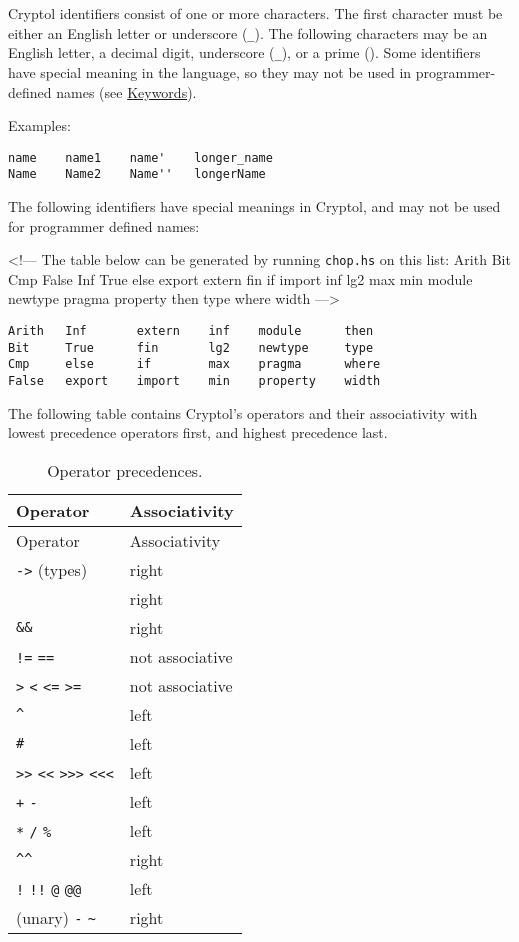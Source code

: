 Cryptol identifiers consist of one or more characters. The first
character must be either an English letter or underscore (\texttt{\_}).
The following characters may be an English letter, a decimal digit,
underscore (\texttt{\_}), or a prime (\texttt{\textquotesingle{}}). Some
identifiers have special meaning in the language, so they may not be
used in programmer-defined names (see
\hyperref[keywords-and-built-in-operators]{Keywords}).

Examples:

\begin{verbatim}
name    name1    name'    longer_name
Name    Name2    Name''   longerName
\end{verbatim}


The following identifiers have special meanings in Cryptol, and may not
be used for programmer defined names:

\textless{}!--- The table below can be generated by running
\texttt{chop.hs} on this list: Arith Bit Cmp False Inf True else export
extern fin if import inf lg2 max min module newtype pragma property then
type where width ---\textgreater{}

\begin{verbatim}
Arith   Inf       extern    inf    module      then     
Bit     True      fin       lg2    newtype     type     
Cmp     else      if        max    pragma      where    
False   export    import    min    property    width    
\end{verbatim}

The following table contains Cryptol's operators and their associativity
with lowest precedence operators first, and highest precedence last.

\begin{longtable}[c]{@{}ll@{}}
\caption{Operator precedences.}\tabularnewline
\toprule
Operator & Associativity\tabularnewline
\midrule
\endfirsthead
\toprule
Operator & Associativity\tabularnewline
\midrule
\endhead
\texttt{-\textgreater{}} (types) & right\tabularnewline
\texttt{\textbar{}\textbar{}} & right\tabularnewline
\texttt{\&\&} & right\tabularnewline
\texttt{!=} \texttt{==} & not associative\tabularnewline
\texttt{\textgreater{}} \texttt{\textless{}} \texttt{\textless{}=}
\texttt{\textgreater{}=} & not associative\tabularnewline
\texttt{\^{}} & left\tabularnewline
\texttt{\#} & left\tabularnewline
\texttt{\textgreater{}\textgreater{}} \texttt{\textless{}\textless{}}
\texttt{\textgreater{}\textgreater{}\textgreater{}}
\texttt{\textless{}\textless{}\textless{}} & left\tabularnewline
\texttt{+} \texttt{-} & left\tabularnewline
\texttt{*} \texttt{/} \texttt{\%} & left\tabularnewline
\texttt{\^{}\^{}} & right\tabularnewline
\texttt{!} \texttt{!!} \texttt{@} \texttt{@@} & left\tabularnewline
(unary) \texttt{-} \texttt{\textasciitilde{}} & right\tabularnewline
\bottomrule
\end{longtable}


